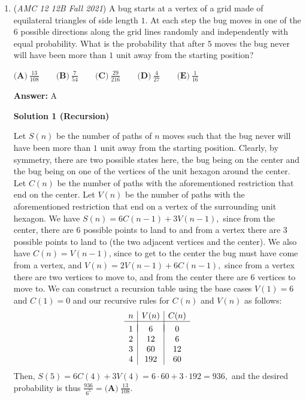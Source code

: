 \begin{enumerate}
	\item (\textit{AMC 12 12B Fall 2021}) A bug starts at a vertex of a grid made of equilateral triangles of side length $1$. At each step the bug moves in one of the $6$ possible directions along the grid lines randomly and independently with equal probability. What is the probability that after $5$ moves the bug never will have been more than $1$ unit away from the starting position?


 $\textbf{(A)}\ \frac{13}{108} \qquad\textbf{(B)}\  \frac{7}{54} \qquad\textbf{(C)}\  \frac{29}{216} \qquad\textbf{(D)}\ \frac{4}{27} \qquad\textbf{(E)}\ \frac{1}{16}$

 \textbf{Answer: }A



\textbf{Solution 1 (Recursion)}

Let $S(n)$ be the number of paths of $n$ moves such that the bug never will have been more than $1$ unit away from the starting position. Clearly, by symmetry, there are two possible states here, the bug being on the center and the bug being on one of the vertices of the unit hexagon around the center. Let $C(n)$ be the number of paths with the aforementioned restriction that end on the center. Let $V(n)$ be the number of paths with the aforementioned restriction that end on a vertex of the surrounding unit hexagon. We have $S(n) = 6C(n-1) + 3V(n-1),$ since from the center, there are $6$ possible points to land to and from a vertex there are $3$ possible points to land to (the two adjacent vertices and the center). We also have $C(n) = V(n-1)$, since to get to the center the bug must have come from a vertex, and $V(n) = 2V(n-1) + 6C(n-1),$ since from a vertex there are two vertices to move to, and from the center there are $6$ vertices to move to. We can construct a recursion table using the base cases $V(1) = 6$ and $C(1) = 0$ and our recursive rules for $C(n)$ and $V(n)$ as follows: 
 \[\begin{array}{c|c|c} n & V(n) & C(n) \\ \hline & & \\ [-2ex] 1 & 6 & 0 \\ 2 & 12 & 6 \\ 3 & 60 & 12 \\ 4 & 192 & 60 \\ \end{array}\]Then, $S(5) = 6C(4) + 3V(4) = 6 \cdot 60 + 3 \cdot 192 = 936,$ and the desired probability is thus $\frac{936}{6^5} = \boxed{\textbf{(A)}\ \frac{13}{108}}.$





\end{enumerate}
